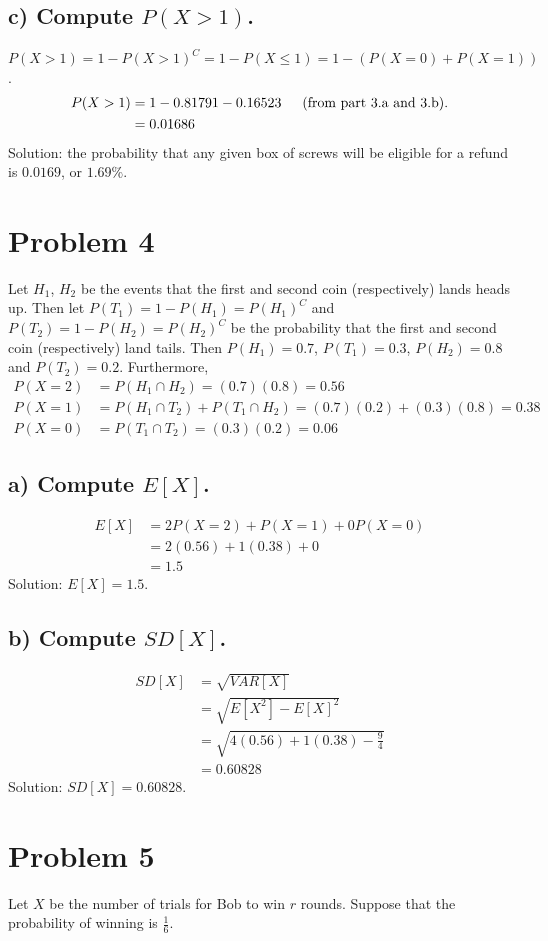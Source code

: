 \documentclass[11pt, letterpaper]{article}
\begin{document}
\subsection*{c) \normalfont Compute $P(X>1)$.}
$P(X>1)=1-P(X>1)^C=1-P(X\leq 1)=1-(P(X=0)+P(X=1))$.
\begin{align*}
P(X>1)&=1-0.81791-0.16523 \text{\indent (from part 3.a and 3.b).}\\
&=0.01686
\end{align*}
Solution: the probability that any given box of screws will be eligible for a refund is $0.0169$, or $1.69\%$.

\section*{Problem 4}
Let $H_1$, $H_2$ be the events that the first and second coin (respectively) lands heads up. Then let
$P(T_1)=1-P(H_1)=P(H_1)^C$ and $P(T_2)=1-P(H_2)=P(H_2)^C$ be the probability that the first and second 
coin (respectively) land tails. Then $P(H_1)=0.7$, $P(T_1)=0.3$, $P(H_2)=0.8$ and $P(T_2)=0.2$. Furthermore,
\begin{align*}
    P(X=2)&=P(H_1\cap H_2)=(0.7)(0.8)=0.56\\
    P(X=1)&=P(H_1\cap T_2) + P(T_1\cap H_2)=(0.7)(0.2)+(0.3)(0.8)=0.38\\
    P(X=0)&=P(T_1\cap T_2)=(0.3)(0.2)=0.06
\end{align*}
\subsection*{a) \normalfont Compute $E[X]$.}
\begin{align*}
E[X]&=2P(X=2)+P(X=1)+0P(X=0)\\
&=2(0.56)+1(0.38)+0\\
&=1.5
\end{align*}
Solution: $E[X]=1.5$.
\subsection*{b) \normalfont Compute $SD[X]$.}
\begin{align*}
    SD[X]&=\sqrt{VAR[X]}\\
    &=\sqrt{E[X^2]-E[X]^2}\\
    &=\sqrt{4(0.56)+1(0.38)-\frac{9}{4}}\\
    &=0.60828
\end{align*}
Solution: $SD[X]=0.60828$.

\section*{Problem 5}
Let $X$ be the number of trials for Bob to win $r$ rounds. Suppose that the probability of
winning is $\frac{1}{6}$.
\end{document}
